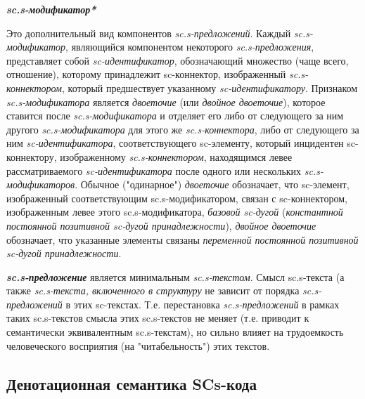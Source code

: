 \bigskip
\textbf{\textit{sc.s-модификатор*}}

Это дополнительный вид компонентов \textit{sc.s-предложений}. Каждый \textit{sc.s-модификатор}, являющийся компонентом некоторого \textit{sc.s-предложения}, представляет собой \textit{sc-идентификатор}, обозначающий множество (чаще всего, отношение), которому принадлежит sc-коннектор, изображенный \textit{sc.s-коннектором}, который предшествует указанному \textit{sc-идентификатору}. Признаком \textit{sc.s-модификатора} является \textit{двоеточие} (или \textit{двойное двоеточие}), которое ставится после \textit{sc.s-модификатора} и отделяет его либо от следующего за ним другого \textit{sc.s-модификатора} для этого же \textit{sc.s-коннектора}, либо от следующего за ним \textit{sc-идентификатора}, соответствующего sc-элементу, который инцидентен sc-коннектору, изображенному \textit{sc.s-коннектором}, находящимся левее рассматриваемого \textit{sc-идентификатора} после одного или нескольких \textit{sc.s-модификаторов}. Обычное ("одинарное"{}) \textit{двоеточие} обозначает, что sc-элемент, изображенный соответствующим \mbox{sc.s-модификатором}, связан с sc-коннектором, изображенным левее этого \mbox{sc.s-модификатора}, \textit{базовой \mbox{sc-дугой}} (\textit{константной постоянной позитивной \mbox{sc-дугой} принадлежности}), \textit{двойное двоеточие} обозначает, что указанные элементы связаны \textit{переменной постоянной позитивной \mbox{sc-дугой} принадлежности}.


\begin{SCn}
\end{SCn}

\textbf{\textit{sc.s-предложение}} является минимальным \textit{sc.s-текстом}. Смысл sc.s-текста (а также \textit{sc.s-текста, включенного в структуру} не зависит от порядка \textit{\mbox{sc.s-предложений}} в этих sc-текстах. Т.е. перестановка \textit{\mbox{sc.s-предложений}} в рамках таких \mbox{sc.s-текстов} смысла этих \mbox{sc.s-текстов} не меняет (т.е. приводит к семантически эквивалентным \mbox{sc.s-текстам}), но сильно влияет на трудоемкость человеческого восприятия (на "читабельность"{}) этих текстов.

\newpage
\subsection{Денотационная семантика SCs-кода}


